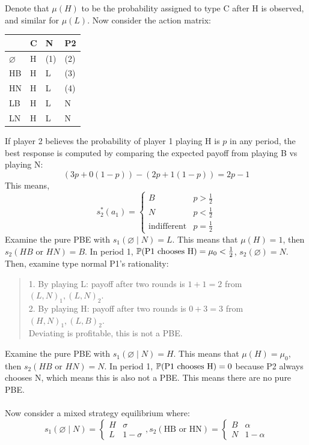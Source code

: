 Denote that $\mu(H)$ to be the probability assigned to type C after H is observed, and similar for $\mu(L)$. Now consider the action matrix:
\begin{center}
    \begin{tabular}{|l|l|l|l|}
    \hline
    & C & N & P2 \\ \hline
   $\varnothing$ & H & (1) & (2) \\ \hline
   HB & H & L & (3) \\ \hline
   HN & H & L & (4) \\ \hline
   LB & H & L & N \\ \hline
   LN & H & L & N \\ \hline
    \end{tabular}
\end{center}
If player 2 believes the probability of player 1 playing H is $p$ in any period, the best response is computed by comparing the expected payoff from playing B vs playing N:
$$(3p + 0(1-p)) - (2p + 1(1 - p)) = 2p-1$$
This means,
$$s_2^*(a_1) = \begin{cases}
    B & p > \frac{1}{2} \\
    N & p < \frac{1}{2} \\
    \text{indifferent} & p = \frac{1}{2}
\end{cases}$$
Examine the pure PBE with $s_1(\varnothing \mid N) = L$. This means that $\mu(H) = 1$, then $s_2(HB \text{ or } HN) = B$. In period 1, $\mathbb{P}(\text{P1 chooses H}) = \mu_0 < \frac{1}{2}$, $s_2(\varnothing) = N$. Then, examine type normal P1's rationality:
\begin{quote}
    1. By playing L: payoff after two rounds is $1 + 1 = 2$ from $(L, N)_1, (L, N)_2$. \\
    2. By playing H: payoff after two rounds is $0 + 3 = 3$ from $(H, N)_1, (L, B)_2$. \\
    Deviating is profitable, this is not a PBE.
\end{quote}
Examine the pure PBE with $s_1(\varnothing \mid N) = H$. This means that 
$\mu(H) = \mu_0$, then $s_2(HB \text{ or } HN) = N$. In period 1, $\mathbb{P}(\text{P1 chooses H}) = 0$ because P2 always chooses N, which means this is also not a PBE. This means there are no pure PBE. \\
\bigskip \\
Now consider a mixed strategy equilibrium where:
$$s_1(\varnothing \mid N) = \begin{cases}
    H & \sigma \\
    L & 1 - \sigma
\end{cases}, s_2(\text{HB or HN}) = \begin{cases}
    B & \alpha \\
    N & 1 - \alpha
\end{cases}$$
